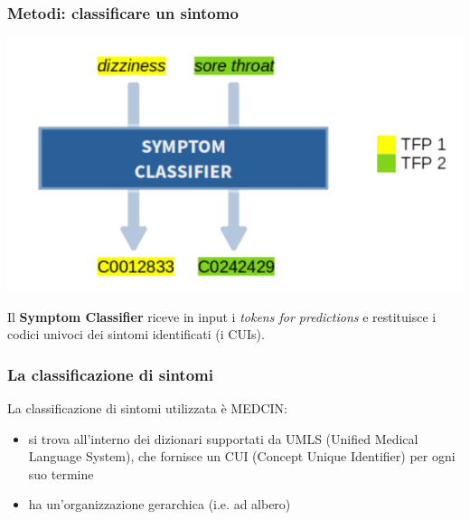 \documentclass{beamer}
\begin{document}
\begin{frame}
\frametitle{Metodi: classificare un sintomo}

\includegraphics[width=\textwidth]{images/symptom_classifier1.png}

Il \textbf{Symptom Classifier} riceve in input i \emph{tokens for predictions} e restituisce i codici univoci dei sintomi identificati (i CUIs).

\end{frame}

\begin{frame}
\frametitle{La classificazione di sintomi}

La classificazione di sintomi utilizzata è MEDCIN:\pause
\begin{itemize}
  \item si trova all'interno dei dizionari supportati da UMLS (Unified Medical Language System), che fornisce un CUI (Concept Unique Identifier) per ogni suo termine\pause
  \item ha un'organizzazione gerarchica (i.e. ad albero)
\end{itemize}
\end{frame}
\end{document}
